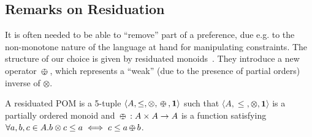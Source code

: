 \documentclass{llncs}
\def\monid{{\mathbf 0}}
\def\monop{\otimes}
\def\odiv{\, {\ominus\hspace{-7.7pt} \div} \,}
\def\monid{\mathbf{1}}
\begin{document}
%
%
%

%
%
%

\subsection{Remarks on Residuation}\label{sec:ror}
It is often needed to be able to ``remove'' part of a preference, due e.g. 
to the non-monotone nature of the language at hand
for manipulating constraints. 
%
The structure of our choice is given by residuated monoids~\cite{golanShort}. 
%
They introduce a new operator $\odiv$, which represents a ``weak'' (due to the presence of partial orders) inverse of $\otimes$.

\begin{definition}[residuation]\label{def:repo}
	A residuated POM is a 5-tuple $\langle A, \leq, \monop, \odiv, \monid \rangle$ such that
	$\langle A, \leq, \monop, \monid \rangle$ is a partially ordered monoid and
	$\odiv: A \times A \rightarrow A$ is a function satisfying $\forall a, b, c \in A. b \monop c \leq a \iff c \leq a \odiv b$.
\end{definition}
\end{document}
